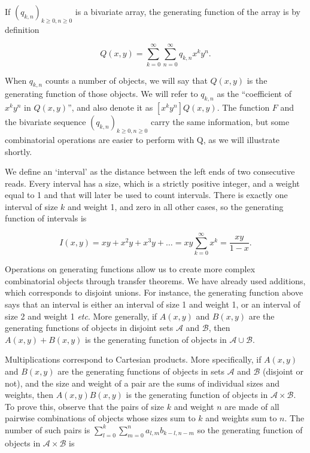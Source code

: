 \documentclass{article}
\begin{document}
If $(q_{k,n})_{k \geq 0, n \geq 0}$ is a bivariate array, the generating
function of the array is by definition

\begin{equation}
Q(x,y) = \sum_{k=0}^\infty \sum_{n=0}^\infty q_{k,n}x^ky^n.
\end{equation}

When $q_{k,n}$ counts a number of objects, we will say that $Q(x,y)$ is
the generating function of those objects. We will refer to $q_{k,n}$ as
the ``coefficient of $x^ky^n$ in $Q(x,y)$'', and also denote it as
$[x^ky^n] Q(x,y)$. The function $F$ and the bivariate sequence
$(q_{k,n})_{k \geq 0, n \geq 0}$ carry the same information, but some
combinatorial operations are easier to perform with Q, as we will
illustrate shortly.

We define an `interval' as the distance between the left ends of two
consecutive reads. Every interval has a size, which is a strictly positive
integer, and a weight equal to 1 and that will later be used to count
intervals.  There is exactly one interval of size $k$ and weight 1, and
zero in all other cases, so the generating function of intervals is

\begin{equation*}
I(x,y) = xy + x^2y + x^3y + \ldots
= xy\sum_{k=0}^\infty x^k = \frac{xy}{1-x}.
\end{equation*}

Operations on generating functions allow us to create more complex
combinatorial objects through transfer theorems.  We have already used
additions, which corresponds to disjoint unions. For instance, the
generating function above says that an interval is either an interval of
size 1 and weight 1, or an interval of size 2 and weight 1 \textit{etc}.
More generally, if $A(x,y)$ and $B(x,y)$ are the generating functions of
objects in disjoint sets $\mathcal{A}$ and $\mathcal{B}$, then
$A(x,y)+B(x,y)$ is the generating function of objects in $\mathcal{A} \cup
\mathcal{B}$.

Multiplications correspond to Cartesian products. More specifically, if
$A(x,y)$ and $B(x,y)$ are the generating functions of objects in sets
$\mathcal{A}$ and $\mathcal{B}$ (disjoint or not), and the size and weight
of a pair are the sums of individual sizes and weights, then
$A(x,y)B(x,y)$ is the generating function of objects in $\mathcal{A}
\times \mathcal{B}$. To prove this, observe that the pairs of size $k$ and
weight $n$ are made of all pairwise combinations of objects whose sizes
sum to $k$ and weights sum to $n$. The number of such pairs is
$\sum_{l=0}^k \sum_{m=0}^n a_{l,m}b_{k-l,n-m}$ so the generating function
of objects in $\mathcal{A} \times \mathcal{B}$ is
\end{document}
